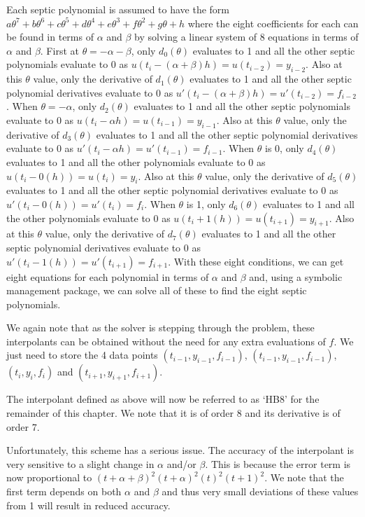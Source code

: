 \documentclass{article}
\begin{document}
Each septic polynomial is assumed to have the form $a\theta^7 + b\theta^6 + c\theta^5 + d\theta^4 + e\theta^3 + f\theta^2 + g\theta + h$ where the eight coefficients for each can be found in terms of $\alpha$ and $\beta$ by solving a linear system of 8 equations in terms of $\alpha$ and $\beta$. First at $\theta = -\alpha-\beta$, only $d_0(\theta)$ evaluates to 1 and all the other septic polynomials evaluate to 0 as $u(t_i - (\alpha+\beta) h) = u(t_{i - 2}) = y_{i - 2}$. Also at this $\theta$ value, only the derivative of $d_1(\theta)$ evaluates to 1 and all the other septic polynomial derivatives evaluate to 0 as $u'(t_i - (\alpha+\beta) h) = u'(t_{i - 2}) = f_{i - 2}$. When $\theta = -\alpha$, only $d_2(\theta)$ evaluates to 1 and all the other septic polynomials evaluate to 0 as $u(t_i - \alpha h) = u(t_{i - 1}) = y_{i - 1}$. Also at this $\theta$ value, only the derivative of $d_3(\theta)$ evaluates to 1 and all the other septic polynomial derivatives evaluate to 0 as $u'(t_i - \alpha h) = u'(t_{i - 1}) = f_{i - 1}$. When $\theta$ is 0, only $d_4(\theta)$ evaluates to 1 and all the other polynomials evaluate to 0 as $u(t_i - 0(h)) = u(t_i) = y_i$. Also at this $\theta$ value, only the derivative of $d_5(\theta)$ evaluates to 1 and all the other septic polynomial derivatives evaluate to 0 as $u'(t_i - 0(h)) = u'(t_i) = f_i$. When $\theta$ is 1, only $d_6(\theta)$ evaluates to 1 and all the other polynomials evaluate to 0 as $u(t_i + 1(h)) = u(t_{i+1}) = y_{i+1}$. Also at this $\theta$ value, only the derivative of $d_7(\theta)$ evaluates to 1 and all the other septic polynomial derivatives evaluate to 0 as $u'(t_i - 1(h)) = u'(t_{i+1}) = f_{i+1}$. With these eight conditions, we can get eight equations for each polynomial in terms of $\alpha$ and $\beta$ and, using a symbolic management package, we can solve all of these to find the eight septic polynomials.

We again note that as the solver is stepping through the problem, these interpolants can be obtained without the need for any extra evaluations of $f$. We just need to store the 4 data points $(t_{i-1}, y_{i - 1}, f_{i - 1})$, $(t_{i-1}, y_{i - 1}, f_{i - 1})$, $(t_i, y_i, f_i)$ and $(t_{i + 1}, y_{i + 1}, f_{i + 1})$.

The interpolant defined as above will now be referred to as `HB8' for the remainder of this chapter. We note that it is of order 8 and its derivative is of order 7.

Unfortunately, this scheme has a serious issue. The accuracy of the interpolant is very sensitive to a slight change in $\alpha$ and/or $\beta$. This is because the error term is now proportional to $(t + \alpha + \beta)^2(t+\alpha)^2(t)^2(t+1)^2$. We note that the first term depends on both $\alpha$ and $\beta$ and thus very small deviations of these values from 1 will result in reduced accuracy. 
\end{document}
